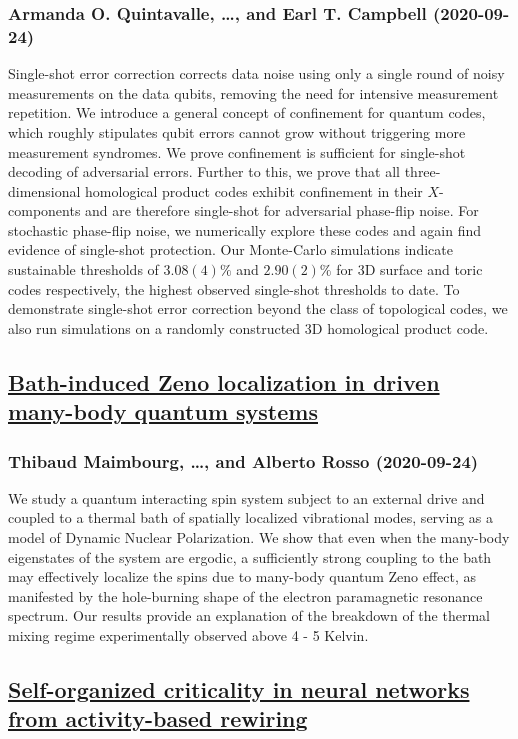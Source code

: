 \subsubsection*{Armanda O. Quintavalle, \dots, and Earl T. Campbell (2020-09-24)}
Single-shot error correction corrects data noise using only a single round of
noisy measurements on the data qubits, removing the need for intensive
measurement repetition. We introduce a general concept of confinement for
quantum codes, which roughly stipulates qubit errors cannot grow without
triggering more measurement syndromes. We prove confinement is sufficient for
single-shot decoding of adversarial errors. Further to this, we prove that all
three-dimensional homological product codes exhibit confinement in their
$X$-components and are therefore single-shot for adversarial phase-flip noise.
For stochastic phase-flip noise, we numerically explore these codes and again
find evidence of single-shot protection. Our Monte-Carlo simulations indicate
sustainable thresholds of $3.08(4)\%$ and $2.90(2)\%$ for 3D surface and toric
codes respectively, the highest observed single-shot thresholds to date. To
demonstrate single-shot error correction beyond the class of topological codes,
we also run simulations on a randomly constructed 3D homological product code.

\subsection*{\href{http://arxiv.org/abs/2009.11784v1}{Bath-induced Zeno localization in driven many-body quantum systems}}
\subsubsection*{Thibaud Maimbourg, \dots, and Alberto Rosso (2020-09-24)}
We study a quantum interacting spin system subject to an external drive and
coupled to a thermal bath of spatially localized vibrational modes, serving as
a model of Dynamic Nuclear Polarization. We show that even when the many-body
eigenstates of the system are ergodic, a sufficiently strong coupling to the
bath may effectively localize the spins due to many-body quantum Zeno effect,
as manifested by the hole-burning shape of the electron paramagnetic resonance
spectrum. Our results provide an explanation of the breakdown of the thermal
mixing regime experimentally observed above 4 - 5 Kelvin.

\subsection*{\href{http://arxiv.org/abs/2009.11781v1}{Self-organized criticality in neural networks from activity-based  rewiring}}
